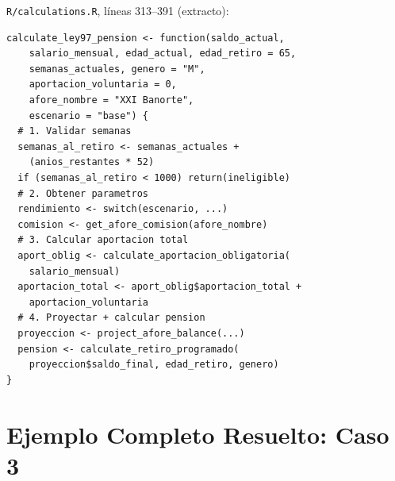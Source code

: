 \documentclass[11pt,a4paper]{report}
\theoremstyle{remark}
\begin{document}
\begin{tcolorbox}[colback=orange!5!white, colframe=orange!75!black, title=\textbf{Aplicaci\'on en C\'odigo}]
\texttt{R/calculations.R}, l\'ineas 313--391 (extracto):
\begin{lstlisting}
calculate_ley97_pension <- function(saldo_actual,
    salario_mensual, edad_actual, edad_retiro = 65,
    semanas_actuales, genero = "M",
    aportacion_voluntaria = 0,
    afore_nombre = "XXI Banorte",
    escenario = "base") {
  # 1. Validar semanas
  semanas_al_retiro <- semanas_actuales +
    (anios_restantes * 52)
  if (semanas_al_retiro < 1000) return(ineligible)
  # 2. Obtener parametros
  rendimiento <- switch(escenario, ...)
  comision <- get_afore_comision(afore_nombre)
  # 3. Calcular aportacion total
  aport_oblig <- calculate_aportacion_obligatoria(
    salario_mensual)
  aportacion_total <- aport_oblig$aportacion_total +
    aportacion_voluntaria
  # 4. Proyectar + calcular pension
  proyeccion <- project_afore_balance(...)
  pension <- calculate_retiro_programado(
    proyeccion$saldo_final, edad_retiro, genero)
}
\end{lstlisting}
\end{tcolorbox}

\section{Ejemplo Completo Resuelto: Caso 3}
\end{document}
